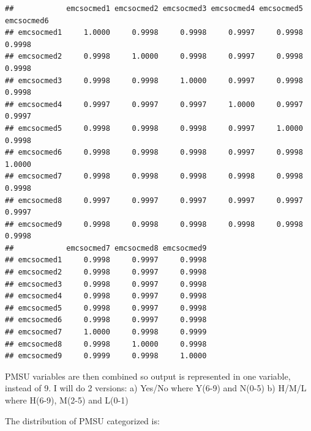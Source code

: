 \documentclass[
]{article}
\begin{document}
\begin{verbatim}
##            emcsocmed1 emcsocmed2 emcsocmed3 emcsocmed4 emcsocmed5 emcsocmed6
## emcsocmed1     1.0000     0.9998     0.9998     0.9997     0.9998     0.9998
## emcsocmed2     0.9998     1.0000     0.9998     0.9997     0.9998     0.9998
## emcsocmed3     0.9998     0.9998     1.0000     0.9997     0.9998     0.9998
## emcsocmed4     0.9997     0.9997     0.9997     1.0000     0.9997     0.9997
## emcsocmed5     0.9998     0.9998     0.9998     0.9997     1.0000     0.9998
## emcsocmed6     0.9998     0.9998     0.9998     0.9997     0.9998     1.0000
## emcsocmed7     0.9998     0.9998     0.9998     0.9998     0.9998     0.9998
## emcsocmed8     0.9997     0.9997     0.9997     0.9997     0.9997     0.9997
## emcsocmed9     0.9998     0.9998     0.9998     0.9998     0.9998     0.9998
##            emcsocmed7 emcsocmed8 emcsocmed9
## emcsocmed1     0.9998     0.9997     0.9998
## emcsocmed2     0.9998     0.9997     0.9998
## emcsocmed3     0.9998     0.9997     0.9998
## emcsocmed4     0.9998     0.9997     0.9998
## emcsocmed5     0.9998     0.9997     0.9998
## emcsocmed6     0.9998     0.9997     0.9998
## emcsocmed7     1.0000     0.9998     0.9999
## emcsocmed8     0.9998     1.0000     0.9998
## emcsocmed9     0.9999     0.9998     1.0000
\end{verbatim}

PMSU variables are then combined so output is represented in one
variable, instead of 9. I will do 2 versions: a) Yes/No where Y(6-9) and
N(0-5) b) H/M/L where H(6-9), M(2-5) and L(0-1)

The distribution of PMSU categorized is:
\end{document}
